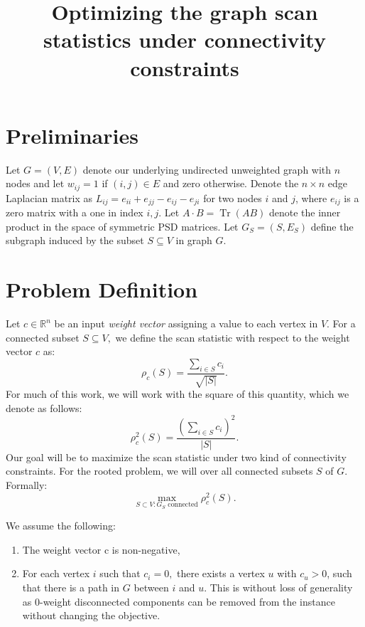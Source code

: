 \documentclass{article}
\DeclareMathOperator{\Tr}{Tr}
\begin{document}
\title{Optimizing the graph scan statistics under connectivity constraints}
\author{\vspace{-10pt}}

\maketitle

\section{Preliminaries}

Let $G = (V,E)$ denote our underlying undirected unweighted graph with $n$ nodes and let $w_{ij} = 1$ if $(i,j) \in E$ and zero otherwise. Denote the $n \times n$ edge Laplacian matrix as $L_{ij} = e_{ii} + e_{jj} - e_{ij} - e_{ji}$ for two nodes $i$ and $j$, where $e_{ij}$ is a zero matrix with a one in index $i,j$. Let $A \cdot B = \Tr(A B)$ denote the inner product in the space of symmetric PSD matrices. Let $G_S = (S, E_S)$ define the subgraph induced by the subset $S \subseteq V$ in  graph $G$.


\section{Problem Definition}

Let $c \in \mathbb{R}^n$ be an input {\it weight vector} assigning a value to each vertex in $V.$
For a connected subset $S \subseteq V,$ we define the scan statistic with respect to the weight vector $c$ as:
$$
\rho_c (S) = \frac{\sum_{i \in S} c_i}{\sqrt{|S|}}.
$$
For much of this work, we will work with the square of this quantity, which we denote as follows:
$$
\rho^2_c(S) = \frac{\left(\sum_{i \in S} c_i\right)^2}{|S|}.
$$
Our goal will be to maximize the scan statistic under two kind of connectivity constraints. For the rooted problem, we will over all connected subsets $S$ of $G$. Formally:
\begin{equation}\label{eq:original_S}
  \max_{S \subset V: G_S \text{ connected}} \rho^2_c(S).
\end{equation}

We assume the following:
\begin{enumerate}
\item The weight vector c is non-negative,
\item For each vertex $i$ such that $c_i = 0,$ there exists a vertex $u$ with $c_u >0$, such that there is a path in $G$ between $i$ and $u.$  This is without loss of generality as 0-weight disconnected components can be removed from the instance without changing the objective. 
\end{enumerate}
\end{document}
